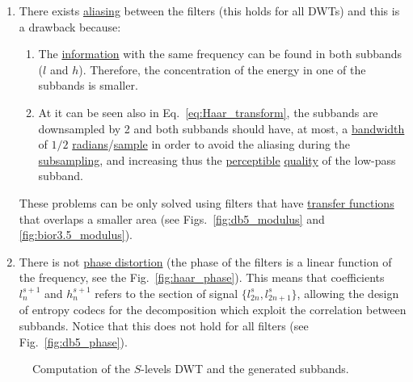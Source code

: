 \begin{enumerate}
\item There exists
  \href{https://en.wikipedia.org/wiki/Aliasing}{aliasing} between the
  filters (this holds for all DWTs) and this is a drawback because:
  \begin{enumerate}
  \item The
    \href{https://en.wikipedia.org/wiki/Information}{information} with
    the same frequency can be found in both subbands ($l$ and
    $h$). Therefore, the concentration of the energy in one of the
    subbands is smaller.
  \item At it can be seen also in Eq.~\ref{eq:Haar_transform}, the
    subbands are downsampled by 2 and both subbands should have, at
    most, a
    \href{https://en.wikipedia.org/wiki/Bandwidth_(signal_processing)}{bandwidth}
    of $1/2$
    \href{https://en.wikipedia.org/wiki/Radian}{radians}/\href{https://en.wikipedia.org/wiki/Sampling_(signal_processing)}{sample}
    in order to avoid the aliasing during the
    \href{https://en.wikipedia.org/wiki/Downsampling_(signal_processing)}{subsampling},
    and increasing thus the
    \href{https://en.wikipedia.org/wiki/Perception}{perceptible}
    \href{https://en.wikipedia.org/wiki/Signal-to-noise_ratio}{quality}
    of the low-pass subband.
  \end{enumerate}
  These problems can be only solved using filters that have
  \href{https://en.wikipedia.org/wiki/Transfer_function}{transfer
    functions} that overlaps a smaller area (see
  Figs.~\ref{fig:db5_modulus} and
  \ref{fig:bior3.5_modulus}).
\item There is not
  \href{https://en.wikipedia.org/wiki/Linear_phase}{phase distortion}
  (the phase of the filters is a linear function of the frequency, see
  the Fig.~\ref{fig:haar_phase}). This means that coefficients
  $l^{s+1}_n$ and $h^{s+1}_n$ refers to the section of signal
  $\{l^s_{2n}, l^s_{2n+1}\}$, allowing the design of entropy codecs
  for the decomposition which exploit the correlation between
  subbands. Notice that this does not hold for all filters (see
  Fig.~\ref{fig:db5_phase}).
\end{enumerate}

\begin{figure}
  \centering
  \caption{Computation of the $S$-levels DWT and the generated
    subbands.}
  \label{fig:DWT}
\end{figure}

